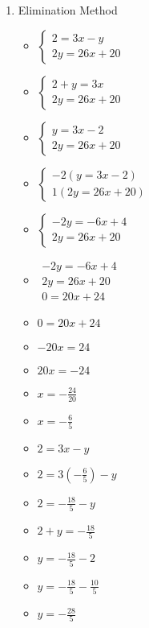 \begin{enumerate}
\begin{enumerate}
  \item Elimination Method
    \begin{itemize}
    \item $\left\{ \begin{array}{l}
          2=3x-y \\
          2y=26x+20 \end{array} \right.$
    \item $\left\{ \begin{array}{l}
          2+y=3x \\
          2y=26x+20 \end{array} \right.$
    \item $\left\{ \begin{array}{l}
          y=3x-2 \\
          2y=26x+20 \end{array} \right.$
    \item $\left\{ \begin{array}{l}
          -2(y=3x-2) \\
          1(2y=26x+20) \end{array} \right.$
    \item $\left\{ \begin{array}{l}
          -2y=-6x+4 \\
          2y=26x+20 \end{array} \right.$
    \item $\begin{array}{l}
          -2y=-6x+4 \\
          2y=26x+20 \\ \hline
          0=20x+24\end{array}$
    \item $0=20x+24$
    \item $-20x=24$
    \item $20x=-24$
    \item {\Large $x=-\frac{24}{20}$}
    \item {\Large $x=-\frac{6}{5}$}
    \item $2=3x-y$
    \item {\Large $2=3\left(-\frac{6}{5}\right)-y$}
    \item {\Large $2=-\frac{18}{5}-y$}
    \item {\Large $2+y=-\frac{18}{5}$}
    \item {\Large $y=-\frac{18}{5}-2$}
    \item {\Large $y=-\frac{18}{5}-\frac{10}{5}$}
    \item {\Large $y=-\frac{28}{5}$}

\end{itemize}
\end{enumerate}
\end{enumerate}
